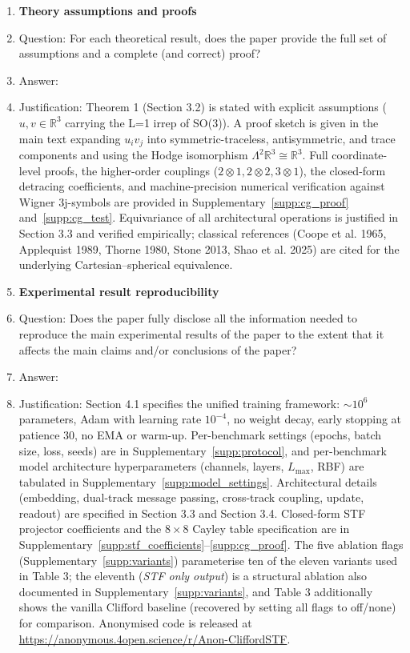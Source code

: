 \begin{enumerate}
\item {\bf Theory assumptions and proofs}
    \item[] Question: For each theoretical result, does the paper provide the full set of assumptions and a complete (and correct) proof?
    \item[] Answer: \answerYes{}
    \item[] Justification: Theorem 1 (Section 3.2) is stated with explicit assumptions ($u, v \in \mathbb{R}^3$ carrying the L=1 irrep of SO(3)). A proof sketch is given in the main text expanding $u_i v_j$ into symmetric-traceless, antisymmetric, and trace components and using the Hodge isomorphism $\Lambda^2 \mathbb{R}^3 \cong \mathbb{R}^3$. Full coordinate-level proofs, the higher-order couplings ($2\otimes 1, 2\otimes 2, 3\otimes 1$), the closed-form detracing coefficients, and machine-precision numerical verification against Wigner 3j-symbols are provided in Supplementary~\ref{supp:cg_proof} and~\ref{supp:cg_test}. Equivariance of all architectural operations is justified in Section 3.3 and verified empirically; classical references (Coope et al. 1965, Applequist 1989, Thorne 1980, Stone 2013, Shao et al. 2025) are cited for the underlying Cartesian--spherical equivalence.

\item {\bf Experimental result reproducibility}
    \item[] Question: Does the paper fully disclose all the information needed to reproduce the main experimental results of the paper to the extent that it affects the main claims and/or conclusions of the paper?
    \item[] Answer: \answerYes{}
    \item[] Justification: Section 4.1 specifies the unified training framework: $\sim 10^6$ parameters, Adam with learning rate $10^{-4}$, no weight decay, early stopping at patience 30, no EMA or warm-up. Per-benchmark settings (epochs, batch size, loss, seeds) are in Supplementary~\ref{supp:protocol}, and per-benchmark model architecture hyperparameters (channels, layers, $L_{\max}$, RBF) are tabulated in Supplementary~\ref{supp:model_settings}. Architectural details (embedding, dual-track message passing, cross-track coupling, update, readout) are specified in Section 3.3 and Section 3.4. Closed-form STF projector coefficients and the $8\times 8$ Cayley table specification are in Supplementary~\ref{supp:stf_coefficients}--\ref{supp:cg_proof}. The five ablation flags (Supplementary~\ref{supp:variants}) parameterise ten of the eleven variants used in Table 3; the eleventh (\emph{STF only output}) is a structural ablation also documented in Supplementary~\ref{supp:variants}, and Table 3 additionally shows the vanilla Clifford baseline (recovered by setting all flags to off/none) for comparison. Anonymised code is released at \url{https://anonymous.4open.science/r/Anon-CliffordSTF}.


\end{enumerate}
